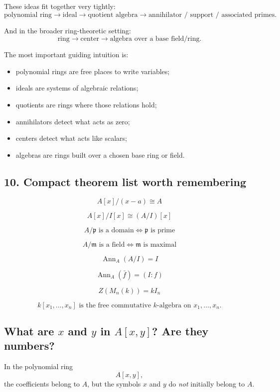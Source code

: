 \documentclass[12pt,a4paper]{article}
\theoremstyle{plain}
\theoremstyle{definition}      %
\begin{document}
	These ideas fit together very tightly:
	\[
	\text{polynomial ring}
	\longrightarrow
	\text{ideal}
	\longrightarrow
	\text{quotient algebra}
	\longrightarrow
	\text{annihilator / support / associated primes}.
	\]
	
	And in the broader ring-theoretic setting:
	\[
	\text{ring}
	\longrightarrow
	\text{center}
	\longrightarrow
	\text{algebra over a base field/ring}.
	\]
	
	The most important guiding intuition is:
	\begin{itemize}
		\item polynomial rings are free places to write variables;
		\item ideals are systems of algebraic relations;
		\item quotients are rings where those relations hold;
		\item annihilators detect what acts as zero;
		\item centers detect what acts like scalars;
		\item algebras are rings built over a chosen base ring or field.
	\end{itemize}
	
	\subsection*{10. Compact theorem list worth remembering}
	
	\[
	A[x]/(x-a)\cong A
	\]
	
	\[
	A[x]/I[x]\cong (A/I)[x]
	\]
	
	\[
	A/\mathfrak p\text{ is a domain}\iff \mathfrak p\text{ is prime}
	\]
	
	\[
	A/\mathfrak m\text{ is a field}\iff \mathfrak m\text{ is maximal}
	\]
	
	\[
	\operatorname{Ann}_A(A/I)=I
	\]
	
	\[
	\operatorname{Ann}_A(\bar f)=(I:f)
	\]
	
	\[
	Z(M_n(k))=kI_n
	\]
	
	\[
	k[x_1,\dots,x_n]\text{ is the free commutative \(k\)-algebra on }x_1,\dots,x_n.
	\]
	
	\subsection*{What are \(x\) and \(y\) in \(A[x,y]\)? Are they numbers?}
	
	In the polynomial ring
	\[
	A[x,y],
	\]
	the coefficients belong to \(A\), but the symbols \(x\) and \(y\) do \emph{not} initially belong to \(A\).
	
\end{document}

